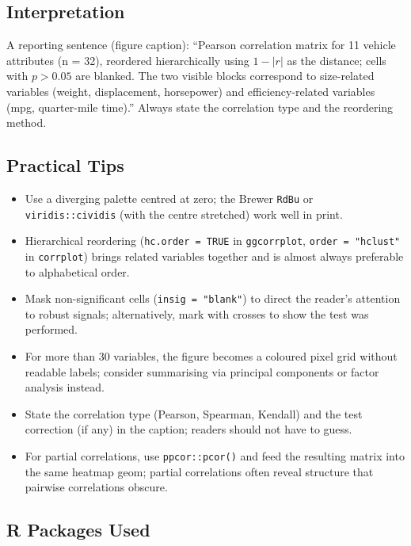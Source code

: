 \documentclass[
]{article}
\providecommand{\tightlist}{%
  \setlength{\itemsep}{0pt}\setlength{\parskip}{0pt}}
\begin{document}
\subsection{Interpretation}\label{interpretation}

A reporting sentence (figure caption): ``Pearson correlation matrix for
11 vehicle attributes (n = 32), reordered hierarchically using
\(1 - |r|\) as the distance; cells with \(p > 0.05\) are blanked. The
two visible blocks correspond to size-related variables (weight,
displacement, horsepower) and efficiency-related variables (mpg,
quarter-mile time).'' Always state the correlation type and the
reordering method.

\subsection{Practical Tips}\label{practical-tips}

\begin{itemize}
\tightlist
\item
  Use a diverging palette centred at zero; the Brewer \texttt{RdBu} or
  \texttt{viridis::cividis} (with the centre stretched) work well in
  print.
\item
  Hierarchical reordering (\texttt{hc.order\ =\ TRUE} in
  \texttt{ggcorrplot}, \texttt{order\ =\ "hclust"} in \texttt{corrplot})
  brings related variables together and is almost always preferable to
  alphabetical order.
\item
  Mask non-significant cells (\texttt{insig\ =\ "blank"}) to direct the
  reader's attention to robust signals; alternatively, mark with crosses
  to show the test was performed.
\item
  For more than 30 variables, the figure becomes a coloured pixel grid
  without readable labels; consider summarising via principal components
  or factor analysis instead.
\item
  State the correlation type (Pearson, Spearman, Kendall) and the test
  correction (if any) in the caption; readers should not have to guess.
\item
  For partial correlations, use \texttt{ppcor::pcor()} and feed the
  resulting matrix into the same heatmap geom; partial correlations
  often reveal structure that pairwise correlations obscure.
\end{itemize}

\subsection{R Packages Used}\label{r-packages-used}
\end{document}
